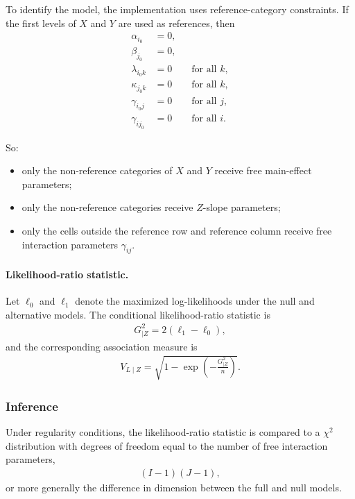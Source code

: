 \documentclass[11pt,a4paper]{article}
\begin{document}
To identify the model, the implementation uses reference-category constraints. If the first levels of $X$ and $Y$ are used as references, then
\begin{align}
\alpha_{i_0} &= 0, \\
\beta_{j_0}  &= 0, \\
\lambda_{i_0 k} &= 0 \qquad \text{for all } k, \\
\kappa_{j_0 k} &= 0 \qquad \text{for all } k, \\
\gamma_{i_0 j} &= 0 \qquad \text{for all } j, \\
\gamma_{i j_0} &= 0 \qquad \text{for all } i.
\end{align}

So:
\begin{itemize}
\item only the non-reference categories of $X$ and $Y$ receive free main-effect parameters;
\item only the non-reference categories receive $Z$-slope parameters;
\item only the cells outside the reference row and reference column receive free interaction parameters $\gamma_{ij}$.
\end{itemize}

\paragraph{Likelihood-ratio statistic.}

Let $\ell_0$ and $\ell_1$ denote the maximized log-likelihoods under the null and alternative models. The conditional likelihood-ratio statistic is
\begin{align}
G^2_{\mid Z} = 2(\ell_1 - \ell_0),
\end{align}
and the corresponding association measure is
\begin{align}
V_{L\mid Z} = \sqrt{1 - \exp\!\left(-\frac{G^2_{\mid Z}}{n}\right)}.
\end{align}

\subsubsection*{Inference}

Under regularity conditions, the likelihood-ratio statistic is compared to a $\chi^2$ distribution with degrees of freedom equal to the number of free interaction parameters,
\begin{align}
(I-1)(J-1),
\end{align}
or more generally the difference in dimension between the full and null models.
\end{document}
